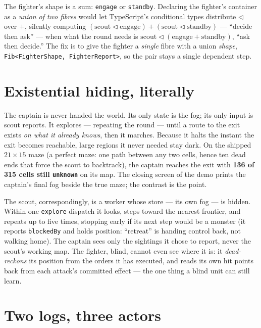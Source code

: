 \documentclass[11pt]{article}
\newcommand{\code}[1]{\texttt{#1}}
\begin{document}
\begin{keybox}
The fighter's shape is a sum: \code{engage} or \code{standby}. Declaring the
fighter's container as a \emph{union of two fibres} would let TypeScript's
conditional types distribute $\lhd$ over $+$, silently computing
$(\text{scout} \lhd \text{engage}) + (\text{scout} \lhd \text{standby})$ --- ``decide
then ask'' --- when what the round needs is $\text{scout} \lhd (\text{engage} +
\text{standby})$, ``ask then decide.'' The fix is to give the fighter a \emph{single}
fibre with a union \emph{shape}, \code{Fib<FighterShape, FighterReport>}, so the pair
stays a single dependent step.
\end{keybox}

\section{Existential hiding, literally}

The captain is never handed the world. Its only state is the fog; its only input is
scout reports. It explores --- repeating the round --- until a route to the exit
exists \emph{on what it already knows}, then it marches. Because it halts the instant
the exit becomes reachable, large regions it never needed stay dark. On the shipped
$21\times15$ maze (a perfect maze: one path between any two cells, hence ten dead
ends that force the scout to backtrack), the captain reaches the exit with
\textbf{136 of 315 cells still \code{unknown}} on its map. The closing screen of the
demo prints the captain's final fog beside the true maze; the contrast is the point.

The scout, correspondingly, is a worker whose store --- its own fog --- is hidden.
Within one \code{explore} dispatch it looks, steps toward the nearest frontier, and
repeats up to five times, stopping early if its next step would be a monster (it
reports \code{blockedBy} and holds position: ``retreat'' is handing control back, not
walking home). The captain sees only the sightings it chose to report, never the
scout's working map. The fighter, blind, cannot even see where it is: it
\emph{dead-reckons} its position from the orders it has executed, and reads its own
hit points back from each attack's committed effect --- the one thing a blind unit
can still learn.

\section{Two logs, three actors}
\end{document}
